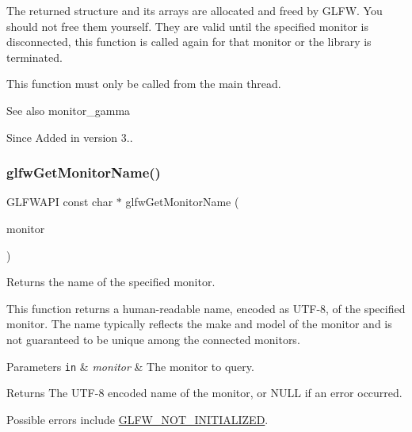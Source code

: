 The returned structure and its arrays are allocated and freed by G\+L\+FW. You should not free them yourself. They are valid until the specified monitor is disconnected, this function is called again for that monitor or the library is terminated.

This function must only be called from the main thread.

\begin{DoxySeeAlso}{See also}
monitor\+\_\+gamma
\end{DoxySeeAlso}
\begin{DoxySince}{Since}
Added in version 3.. 
\end{DoxySince}
\mbox{\label{group__monitor_ga6d0ee079c807cd123b56dc3fc01e8fd9}} 
\subsubsection{\texorpdfstring{glfw\+Get\+Monitor\+Name()}{glfwGetMonitorName()}}
{\footnotesize\ttfamily G\+L\+F\+W\+A\+PI const char $\ast$ glfw\+Get\+Monitor\+Name (\begin{DoxyParamCaption}\item[{\hyperlink{group__monitor_ga8d9efd1cde9426692c73fe40437d0ae3}{G\+L\+F\+Wmonitor} $\ast$}]{monitor }\end{DoxyParamCaption})}



Returns the name of the specified monitor. 

This function returns a human-\/readable name, encoded as U\+T\+F-\/8, of the specified monitor. The name typically reflects the make and model of the monitor and is not guaranteed to be unique among the connected monitors.


\begin{DoxyParams}[1]{Parameters}
\mbox{\tt in}  & {\em monitor} & The monitor to query. \\
\hline
\end{DoxyParams}
\begin{DoxyReturn}{Returns}
The U\+T\+F-\/8 encoded name of the monitor, or {\ttfamily N\+U\+LL} if an error occurred.
\end{DoxyReturn}
Possible errors include \hyperlink{group__errors_ga2374ee02c177f12e1fa76ff3ed15e14a}{G\+L\+F\+W\+\_\+\+N\+O\+T\+\_\+\+I\+N\+I\+T\+I\+A\+L\+I\+Z\+ED}.

